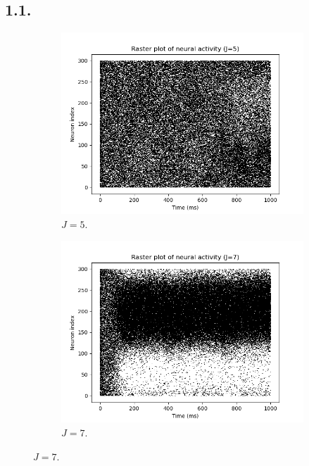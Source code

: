 \documentclass{article}
\begin{document}
\subsection*{1.1.}
\begin{figure}[h!]
  \centering
  \begin{subfigure}[b]{0.32\textwidth}
    \includegraphics[width=\textwidth]{figures/1.1.raster_plot_J5.png}
    \caption{\(J=5\).}
    \label{fig:sub1}
  \end{subfigure}
  \hfill
  \begin{subfigure}[b]{0.32\textwidth}
    \includegraphics[width=\textwidth]{figures/1.1.raster_plot_J7.png}
    \caption{\(J=7\).}
    \label{fig:sub2}
  \end{subfigure}

\end{figure}
\end{document}
